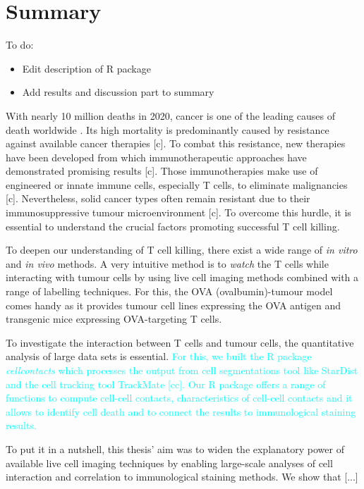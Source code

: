 \documentclass{report}
\begin{document}
\allsectionsfont{\sffamily}
\onehalfspacing

\setlength\parindent{0pt}

\chapter{Summary}

To do:
\begin{itemize}
	\item Edit description of R package
	\item Add results and discussion part to summary
\end{itemize}

With nearly 10 million deaths in 2020, cancer is one of the leading causes of death worldwide \citep{WHO}\citep{WHO_Cancer}. Its high mortality is predominantly caused by resistance against available cancer therapies [c]. To combat this resistance, new therapies have been developed from which immunotherapeutic approaches have demonstrated promising results [c]. Those immunotherapies make use of engineered or innate immune cells, especially T cells, to eliminate malignancies [c]. Nevertheless, solid cancer types often remain resistant due to their immunosuppressive tumour microenvironment [c]. To overcome this hurdle, it is essential to understand the crucial factors promoting successful T cell killing. 

To deepen our understanding of T cell killing, there exist a wide range of \textit{in vitro} and \textit{in vivo} methods. A very intuitive method is to \textit{watch} the T cells while interacting with tumour cells by using live cell imaging methods combined with a range of labelling techniques. For this, the OVA (ovalbumin)-tumour model comes handy as it provides tumour cell lines expressing the OVA antigen and transgenic mice expressing OVA-targeting T cells. 

To investigate the interaction between T cells and tumour cells, the quantitative analysis of large data sets is essential. \textcolor{cyan}{ For this, we built the R package \textit{cellcontacts} which processes the output from cell segmentations tool like StarDist and the cell tracking tool TrackMate [cc]. Our R package offers a range of functions to compute cell-cell  contacts, characteristics of cell-cell contacts and it allows to identify cell death and to connect the results to immunological staining results.}

To put it in a nutshell, this thesis' aim was to widen the explanatory power of available live cell imaging techniques by enabling large-scale analyses of cell interaction and correlation to immunological staining methods. We show that [...]
\end{document}
